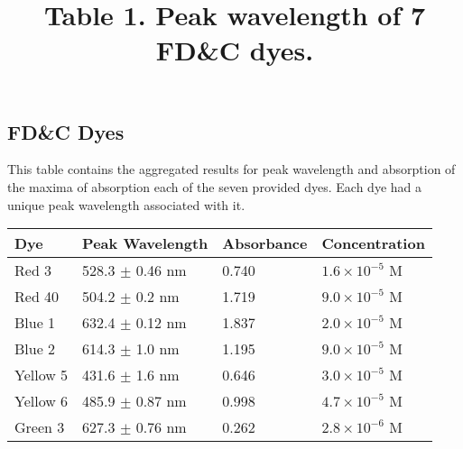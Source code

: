 \documentclass[12pt]{article}
\begin{document}
\subsection*{FD\&C Dyes}
This table contains the aggregated results for peak wavelength and absorption of the maxima of absorption each of the seven provided dyes. Each dye had a unique peak wavelength associated with it.\par\vspace{6pt}
\title{\textbf{Table 1.} Peak wavelength of 7 FD\&C dyes.}
\begin{center}
\begin{tabular}{|L|L|L|L|}
\hline 
Dye & Peak Wavelength & Absorbance & Concentration  \\ 
\hline 
Red 3 & 528.3 $\pm$ 0.46 nm & 0.740 & $1.6 \times 10^{-5}$ M \\
\hline 
Red 40 & 504.2 $\pm$ 0.2 nm & 1.719 & $9.0 \times 10^{-5}$ M \\ 
\hline 
Blue 1 & 632.4 $\pm$ 0.12 nm & 1.837 & $2.0 \times 10^{-5}$ M \\ 
\hline 
Blue 2 & 614.3 $\pm$ 1.0 nm & 1.195 & $9.0 \times 10^{-5}$ M \\ 
\hline 
Yellow 5 & 431.6 $\pm$ 1.6 nm & 0.646 & $3.0 \times 10^{-5}$ M  \\ 
\hline 
Yellow 6 & 485.9 $\pm$ 0.87 nm & 0.998 & $4.7 \times 10^{-5}$ M  \\ 
\hline 
Green 3 & 627.3 $\pm$ 0.76 nm & 0.262 & $2.8 \times 10^{-6}$ M  \\ 
\hline 
\end{tabular} 
\end{center}
%
\end{document}

